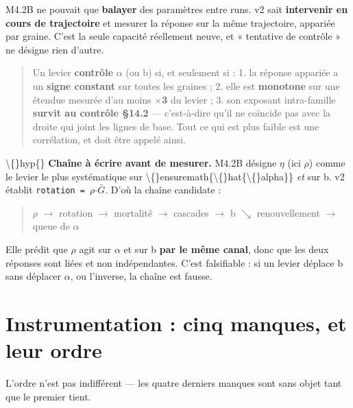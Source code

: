 \documentclass[11pt,a4paper]{article}
\newcommand{\code}[1]{\texttt{#1}}
\begin{document}
M4.2B ne pouvait que \textbf{balayer} des paramètres entre runs. v2 sait \textbf{intervenir en cours de trajectoire} et mesurer la réponse sur la même trajectoire, appariée par graine. C'est la seule capacité réellement neuve, et « tentative de contrôle » ne désigne rien d'autre.

\begin{quote}
Un levier \textbf{contrôle} \ensuremath{\alpha} (ou b) si, et seulement si : 1. la réponse appariée a un \textbf{signe constant} sur toutes les graines ; 2. elle est \textbf{monotone} sur une étendue mesurée d'au moins \textbf{\ensuremath{\times}3} du levier ; 3. son exposant intra-famille \textbf{survit au contrôle §14.2} --- c'est-à-dire qu'il ne coïncide pas avec la droite qui joint les lignes de base. Tout ce qui est plus faible est une corrélation, et doit être appelé ainsi.
\end{quote}

\textbackslash\{\}hyp\{\} \textbf{Chaîne à écrire avant de mesurer.} M4.2B désigne \ensuremath{\eta} (ici \ensuremath{\rho}) comme le levier le plus systématique sur \textbackslash\{\}ensuremath\{\textbackslash\{\}hat\{\textbackslash\{\}alpha\}\} \emph{et} sur b. v2 établit \code{rotation = \ensuremath{\rho}\ensuremath{\cdot}\ensuremath{\bar{G}}}. D'où la chaîne candidate :

\begin{quote}\ttfamily\footnotesize\obeylines
\ensuremath{\rho}  \ensuremath{\rightarrow}  rotation  \ensuremath{\rightarrow}  mortalité  \ensuremath{\rightarrow}  cascades  \ensuremath{\rightarrow}  b
\hspace*{30ex}\ensuremath{\searrow}  renouvellement  \ensuremath{\rightarrow}  queue de \ensuremath{\alpha}
\end{quote}

Elle prédit que \ensuremath{\rho} agit sur \ensuremath{\alpha} et sur b \textbf{par le même canal}, donc que les deux réponses sont liées et non indépendantes. C'est falsifiable : si un levier déplace b sans déplacer \ensuremath{\alpha}, ou l'inverse, la chaîne est fausse.

\bigskip

\setcounter{section}{3}
\section{Instrumentation : cinq manques, et leur ordre}

L'ordre n'est pas indifférent --- les quatre derniers manques sont sans objet tant que le premier tient.
\end{document}
